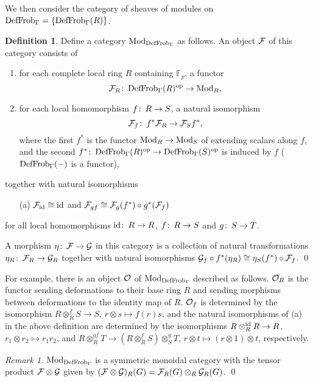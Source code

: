 \documentclass{gtpart}
\theoremstyle{definition}
\newtheorem{defn}[thm]{Definition}
\theoremstyle{remark}
\newtheorem{rmk}[thm]{Remark}
\def\co{\colon\thinspace}
\newcommand{\mb}[1]{\mathbb{#1}}
\newcommand{\Mod}{{\rm Mod}}
\newcommand{\CO}{{\cal O}}
\newcommand{\DF}{{{\rm DefFrob}_\Gamma}}
\begin{document}
We then consider the category of sheaves of modules on $\DF = \{\DF(R)\}$.  
\begin{defn}
\label{def:mod}
 Define a category $\Mod_\DF$ as follows.  An object $\cal F$ of this category 
 consists of 
 \begin{enumerate}
  \item for each complete local ring $R$ containing ${\mb F}_p$, a functor
  \[
  {\cal F}_R\co \DF(R)^{\rm op} \to \Mod_R, 
  \]
  \item for each local homomorphism $f\co R \to S$, a natural isomorphism 
  \[
  {\cal F}_f\co f^*{\cal F}_R \to {\cal F}_{S}f^*, 
  \]
  where the first $f^*$ is the functor $\Mod_R \to \Mod_{S}$ of extending 
  scalars along $f$, and the second 
  $f^*\co \DF(R)^{\rm op} \to \DF(S)^{\rm op}$ is induced by $f$ ($\DF(-)$ is 
  a functor), 
 \end{enumerate}
 together with natural isomorphisms 
 \begin{enumerate}
  \item[(a)] ${\cal F}_{\rm id} \cong {\rm id}$ and 
  ${\cal F}_{gf} \cong {\cal F}_g(f^*) \circ g^*({\cal F}_f)$ 
 \end{enumerate}
 for all local homomorphisms ${\rm id}\co R \to R$, $f\co R \to S$ and 
 $g\co S \to T$.  

 A morphism $\eta\co {\cal F} \to {\cal G}$ in this category is a collection 
 of natural transformations $\eta_R\co {\cal F}_R \to {\cal G}_R$ together 
 with natural isomorphisms ${\cal G}_f \circ f^*(\eta_R) \cong 
 \eta_{S}(f^*) \circ {\cal F}_f$.  \qed
\end{defn}
For example, there is an object $\cal O$ of $\Mod_\DF$ described as follows.  
$\CO_R$ is the functor sending deformations to their base ring $R$ and sending 
morphisms between deformations to the identity map of $R$.  $\CO_f$ is 
determined by the isomorphism $R \otimes_R^f S \to S$, 
$r \otimes s \mapsto f(r) s$, and the natural isomorphisms of (a) in the above 
definition are determined by the isomorphisms $R \otimes_R^{\rm id} R \to R$, 
$r_1 \otimes r_2 \mapsto r_1 r_2$, and 
$R \otimes_R^{gf} T \to (R \otimes_R^f S) \otimes_S^g T$, 
$r \otimes t \mapsto (r \otimes 1) \otimes t$, respectively.  
\begin{rmk}
 $\Mod_\DF$ is a symmetric monoidal category with the tensor product 
 ${\cal F} \otimes {\cal G}$ given by 
 $({\cal F} \otimes {\cal G})_R(G) = {\cal F}_R(G) \otimes_R {\cal G}_R(G)$.  
 \qed
\end{rmk}
\end{document}
